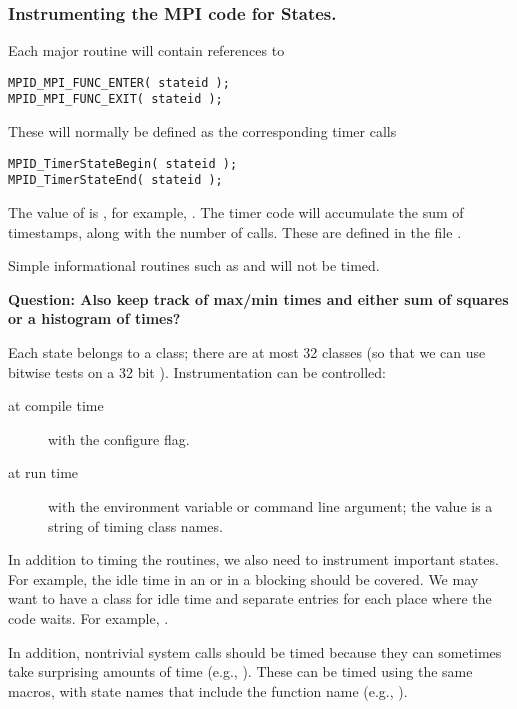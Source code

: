 \documentclass{article}
\begin{document}
\subsubsection{Instrumenting the MPI code for States.}
Each major routine will contain references to 
\begin{verbatim}
MPID_MPI_FUNC_ENTER( stateid );
MPID_MPI_FUNC_EXIT( stateid );
\end{verbatim}
These will normally be defined as the corresponding timer calls
\begin{verbatim}
MPID_TimerStateBegin( stateid );
MPID_TimerStateEnd( stateid );
\end{verbatim}
The value of  is , for example,
.  The timer code will accumulate the sum of
timestamps, along with the number of calls.  These are defined in the file
. 

Simple informational routines such as  and
 will not be timed.

\textbf{Question: Also keep track of max/min times and either sum of squares
  or a histogram of times?}

Each state belongs to a class; there are at most 32 classes (so that we can use
bitwise tests on a 32 bit ).  Instrumentation can be
controlled:
\begin{description}
\item[at compile time]with the  configure flag.
\item[at run time]with the  environment variable or
   command line argument; the value is a string of timing
  class names.
\end{description}

In addition to timing the routines, we also need to instrument important
states.  For example, the idle time in an  or in a blocking
 should be covered.  We may want to have a class for idle time
and separate entries for each place where the code waits.  For example,
.  

In addition, nontrivial system calls should be timed because they can
sometimes take surprising amounts of time (e.g., ).
These can be timed using the same macros, with state names that include the
function name (e.g., ).
\end{document}
